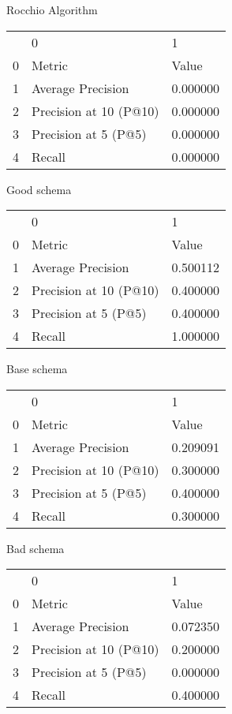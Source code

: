 

Rocchio Algorithm
\begin{tabular}{lll}
 & 0 & 1 \\
0 & Metric & Value \\
1 & Average Precision & 0.000000 \\
2 & Precision at 10 (P@10) & 0.000000 \\
3 & Precision at 5 (P@5) & 0.000000 \\
4 & Recall & 0.000000 \\
\end{tabular}


Good schema
\begin{tabular}{lll}
 & 0 & 1 \\
0 & Metric & Value \\
1 & Average Precision & 0.500112 \\
2 & Precision at 10 (P@10) & 0.400000 \\
3 & Precision at 5 (P@5) & 0.400000 \\
4 & Recall & 1.000000 \\
\end{tabular}


Base schema
\begin{tabular}{lll}
 & 0 & 1 \\
0 & Metric & Value \\
1 & Average Precision & 0.209091 \\
2 & Precision at 10 (P@10) & 0.300000 \\
3 & Precision at 5 (P@5) & 0.400000 \\
4 & Recall & 0.300000 \\
\end{tabular}


Bad schema
\begin{tabular}{lll}
 & 0 & 1 \\
0 & Metric & Value \\
1 & Average Precision & 0.072350 \\
2 & Precision at 10 (P@10) & 0.200000 \\
3 & Precision at 5 (P@5) & 0.000000 \\
4 & Recall & 0.400000 \\
\end{tabular}
